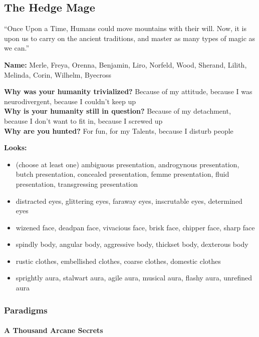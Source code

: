 \documentclass[
]{article}
\providecommand{\tightlist}{%
  \setlength{\itemsep}{0pt}\setlength{\parskip}{0pt}}
\begin{document}
\newpage

\hypertarget{the-hedge-mage}{%
\subsection{The Hedge Mage}\label{the-hedge-mage}}

``Once Upon a Time, Humans could move mountains with their will. Now, it
is upon us to carry on the ancient traditions, and master as many types
of magic as we can.''

\textbf{Name:} Merle, Freya, Orenna, Benjamin, Liro, Norfeld, Wood,
Sherand, Lilith, Melinda, Corin, Wilhelm, Byecross

\textbf{Why was your humanity trivialized?} Because of my attitude,
because I was neurodivergent, because I couldn't keep up\\
\textbf{Why is your humanity still in question?} Because of my
detachment, because I don't want to fit in, because I screwed up\\
\textbf{Why are you hunted?} For fun, for my Talents, because I disturb
people

\textbf{Looks:}

\begin{itemize}
\tightlist
\item
  (choose at least one) ambiguous presentation, androgynous
  presentation, butch presentation, concealed presentation, femme
  presentation, fluid presentation, transgressing presentation
\item
  distracted eyes, glittering eyes, faraway eyes, inscrutable eyes,
  determined eyes
\item
  wizened face, deadpan face, vivacious face, brisk face, chipper face,
  sharp face
\item
  spindly body, angular body, aggressive body, thickset body, dexterous
  body
\item
  rustic clothes, embellished clothes, coarse clothes, domestic clothes
\item
  sprightly aura, stalwart aura, agile aura, musical aura, flashy aura,
  unrefined aura
\end{itemize}

\hypertarget{paradigms-2}{%
\subsubsection{Paradigms}\label{paradigms-2}}

\hypertarget{a-thousand-arcane-secrets}{%
\paragraph{A Thousand Arcane Secrets}\label{a-thousand-arcane-secrets}}
\end{document}
